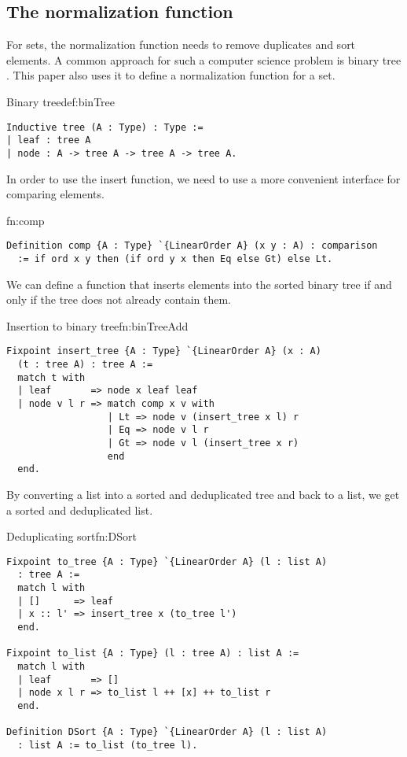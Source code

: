 \subsection{The normalization function}
For sets, the normalization function needs to remove duplicates and sort elements. A common approach for such a computer science problem is binary tree \cite{knuth}. This paper also uses it to define a normalization function for a set.
\begin{defi}{Binary tree}{def:binTree}
\begin{verbatim}
Inductive tree (A : Type) : Type :=
| leaf : tree A
| node : A -> tree A -> tree A -> tree A.
\end{verbatim}
\end{defi}
In order to use the insert function, we need to use a more convenient interface for comparing elements.
\begin{func}{}{fn:comp}
\begin{verbatim}
Definition comp {A : Type} `{LinearOrder A} (x y : A) : comparison 
  := if ord x y then (if ord y x then Eq else Gt) else Lt.
\end{verbatim}
\end{func}
We can define a function that inserts elements into the sorted binary tree if and only if the tree does not already contain them.
\begin{func}[D]{Insertion to binary tree}{fn:binTreeAdd}
\begin{verbatim}
Fixpoint insert_tree {A : Type} `{LinearOrder A} (x : A) 
  (t : tree A) : tree A :=
  match t with
  | leaf       => node x leaf leaf
  | node v l r => match comp x v with
                  | Lt => node v (insert_tree x l) r
                  | Eq => node v l r
                  | Gt => node v l (insert_tree x r)
                  end
  end.
\end{verbatim}
\end{func}
By converting a list into a sorted and deduplicated tree and back to a list, we get a sorted and deduplicated list.
\begin{func}{Deduplicating sort}{fn:DSort}
\begin{verbatim}
Fixpoint to_tree {A : Type} `{LinearOrder A} (l : list A) 
  : tree A := 
  match l with
  | []      => leaf
  | x :: l' => insert_tree x (to_tree l')
  end.

Fixpoint to_list {A : Type} (l : tree A) : list A := 
  match l with
  | leaf       => []
  | node x l r => to_list l ++ [x] ++ to_list r
  end.

Definition DSort {A : Type} `{LinearOrder A} (l : list A) 
  : list A := to_list (to_tree l).
\end{verbatim}
\end{func}
